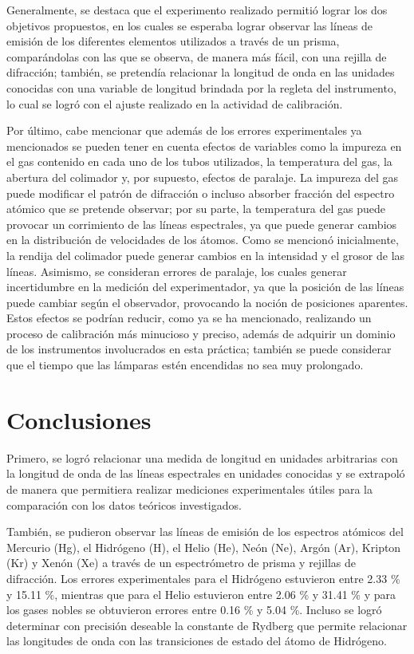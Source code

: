 \documentclass[%
 reprint,
 amsmath,amssymb,
 aps,
]{revtex4-1}
\begin{document}
Generalmente, se destaca que el experimento realizado permitió lograr los dos objetivos propuestos, en los cuales se esperaba lograr observar las líneas de emisión de los diferentes elementos utilizados a través de un prisma, comparándolas con las que se observa, de manera más fácil, con una rejilla de difracción; también, se pretendía relacionar la longitud de onda en las unidades conocidas con una variable de longitud brindada por la regleta del instrumento, lo cual se logró con el ajuste realizado en la actividad de calibración.

Por último, cabe mencionar que además de los errores experimentales ya mencionados se pueden tener en cuenta efectos de variables como la impureza en el gas contenido en cada uno de los tubos utilizados, la temperatura del gas, la abertura del colimador y, por supuesto, efectos de paralaje. La impureza del gas puede modificar el patrón de difracción o incluso absorber fracción del espectro atómico que se pretende observar; por su parte, la temperatura del gas puede provocar un corrimiento de las líneas espectrales, ya que puede generar cambios en la distribución de velocidades de los átomos. Como se mencionó inicialmente, la rendija del colimador puede generar cambios en la intensidad y el grosor de las líneas. Asimismo, se consideran errores de paralaje, los cuales generar incertidumbre en la medición del experimentador, ya que la posición de las líneas puede cambiar según el observador, provocando la noción de posiciones aparentes. Estos efectos se podrían reducir, como ya se ha mencionado, realizando un proceso de calibración más minucioso y preciso, además de adquirir un dominio de los instrumentos involucrados en esta práctica; también se puede considerar que el tiempo que las lámparas estén encendidas no sea muy prolongado.


\section{Conclusiones}

Primero, se logró relacionar una medida de longitud en unidades arbitrarias con la longitud de onda de las líneas espectrales en unidades conocidas y se extrapoló de manera que permitiera realizar mediciones experimentales útiles para la comparación con los datos teóricos investigados.

También, se pudieron observar las líneas de emisión de los espectros atómicos del Mercurio (Hg), el Hidrógeno (H), el Helio (He), Neón (Ne), Argón (Ar), Kripton (Kr) y Xenón (Xe) a través de un espectrómetro de prisma y rejillas de difracción. Los errores experimentales para el Hidrógeno estuvieron entre 2.33 \% y 15.11 \%, mientras que para el Helio estuvieron entre 2.06 \% y 31.41 \% y para los gases nobles se obtuvieron errores entre 0.16 \% y 5.04 \%. Incluso se logró determinar con precisión deseable la constante de Rydberg que permite relacionar las longitudes de onda con las transiciones de estado del átomo de Hidrógeno.
\end{document}

